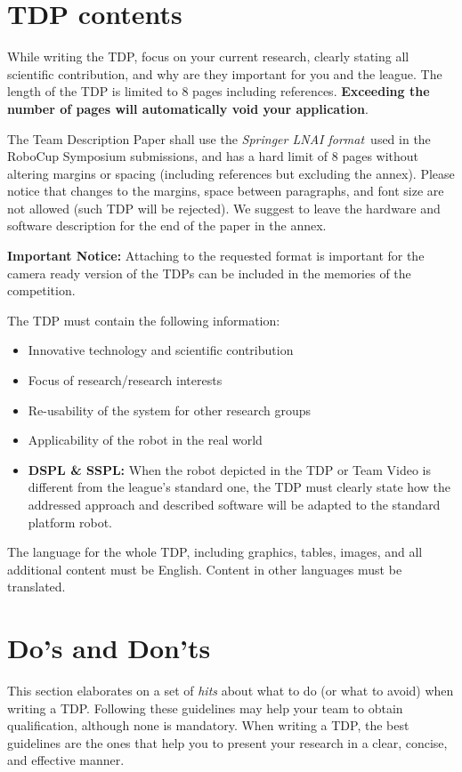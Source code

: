 \documentclass[runningheads,a4paper]{llncs}
\begin{document}
\section{TDP contents}
While writing the TDP, focus on your current research, clearly stating all scientific contribution, and why are they important for you and the league. The length of the TDP is limited to 8 pages including references. \textbf{\color{red} Exceeding the number of pages will automatically void your application}.

The Team Description Paper shall use the \textit{Springer LNAI format}\footnotemark~used in the RoboCup Symposium submissions, and has a hard limit of 8 pages without altering margins or spacing (including references but excluding the annex).
Please notice that changes to the margins, space between paragraphs, and font size are not allowed (such TDP will be rejected). We suggest to leave the hardware and software description for the end of the paper in the annex.

\textbf{Important Notice:} Attaching to the requested format is important for the camera ready version of the TDPs can be included in the memories of the competition.

\noindent The TDP must contain the following information:

\begin{itemize}[nosep]
	\item Innovative technology and scientific contribution
	\item Focus of research/research interests
	\item Re-usability of the system for other research groups
	\item Applicability of the robot in the real world
	\item \textbf{DSPL \& SSPL:} When the robot depicted in the TDP or Team Video is different from the league's standard one, the TDP must clearly state how the addressed approach and described software will be adapted to the standard platform robot.
\end{itemize}

The language for the whole TDP, including graphics, tables, images, and all additional content must be English. Content in other languages must be translated.


\section{Do's and Don'ts}
This section elaborates on a set of \textit{hits} about what to do (or what to avoid) when writing a TDP.
Following these guidelines may help your team to obtain qualification, although none is mandatory.
When writing a TDP, the best guidelines are the ones that help you to present your research in a clear, concise, and effective manner.
\end{document}
